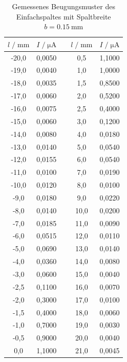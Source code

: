 \begin{table}
    \centering
    \caption{Gemessenes Beugungsmuster des Einfachspaltes mit Spaltbreite $b = \SI{0.15}{\milli\meter}$}
    \label{tab:mess1}
    \begin{tabular}{c c c c c}
    \toprule
    $ l \;/\; \si{\milli\meter} $ & $I \;/\; \si{\micro\ampere}$ & &
    $ l \;/\; \si{\milli\meter} $ & $I \;/\; \si{\micro\ampere}$ \\
    \midrule 
        -20,0 & 0,0050 & \; &  0,5 & 1,1000 \\
        -19,0 & 0,0040 & \; &  1,0 & 1,0000 \\
        -18,0 & 0,0035 & \; &  1,5 & 0,8500 \\
        -17,0 & 0,0060 & \; &  2,0 & 0,5200 \\
        -16,0 & 0,0075 & \; &  2,5 & 0,4000 \\
        -15,0 & 0,0060 & \; &  3,0 & 0,1200 \\
        -14,0 & 0,0080 & \; &  4,0 & 0,0180 \\
        -13,0 & 0,0140 & \; &  5,0 & 0,0540 \\
        -12,0 & 0,0155 & \; &  6,0 & 0,0540 \\
        -11,0 & 0,0100 & \; &  7,0 & 0,0190 \\
        -10,0 & 0,0120 & \; &  8,0 & 0,0100 \\
         -9,0 & 0,0180 & \; &  9,0 & 0,0220 \\
         -8,0 & 0,0140 & \; & 10,0 & 0,0200 \\
         -7,0 & 0,0185 & \; & 11,0 & 0,0090 \\
         -6,0 & 0,0515 & \; & 12,0 & 0,0110 \\
         -5,0 & 0,0690 & \; & 13,0 & 0,0140 \\
         -4,0 & 0,0360 & \; & 14,0 & 0,0080 \\
         -3,0 & 0,0600 & \; & 15,0 & 0,0040 \\
         -2,5 & 0,1100 & \; & 16,0 & 0,0070 \\
         -2,0 & 0,3000 & \; & 17,0 & 0,0100 \\
         -1,5 & 0,4000 & \; & 18,0 & 0,0060 \\
         -1,0 & 0,7000 & \; & 19,0 & 0,0030 \\
         -0,5 & 0,9000 & \; & 20,0 & 0,0040 \\
          0,0 & 1,1000 & \; & 21,0 & 0,0045 \\
          
    \bottomrule
    \end{tabular}
    \end{table}

